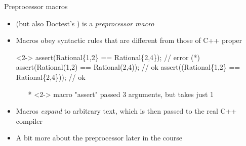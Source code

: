 \begin{frame}[fragile]{Preprocessor macros}

  \begin{itemize}
  \item {} (but also Doctest's ) is a
    \textit{preprocessor macro}
  \item Macros obey syntactic rules that are different from those of C++ proper

    \begin{codeblock}<2->{
assert(Rational\{1\alert{,}2\} == Rational\{2\alert{,}4\});   // error (*)
assert(Rational\alert{(}1,2\alert{)} == Rational\alert{(}2,4\alert{)});   // ok
assert(\alert{(}Rational\{1,2\} == Rational\{2,4\}\alert{)}); // ok}\end{codeblock}

    {\tiny\begin{itemize}
    \item[*]<2-> macro "assert" passed 3 arguments, but takes just 1
    \end{itemize}}
  \item<3-> Macros \textit{expand} to arbitrary text, which is then passed to the
    real C++ compiler
  \item<3-> A bit more about the preprocessor later in the course
  \end{itemize}

\end{frame}

